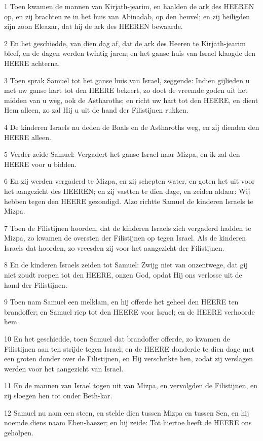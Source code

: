 \par 1 Toen kwamen de mannen van Kirjath-jearim, en haalden de ark des HEEREN op, en zij brachten ze in het huis van Abinadab, op den heuvel; en zij heiligden zijn zoon Eleazar, dat hij de ark des HEEREN bewaarde.
\par 2 En het geschiedde, van dien dag af, dat de ark des Heeren te Kirjath-jearim bleef, en de dagen werden twintig jaren; en het ganse huis van Israel klaagde den HEERE achterna.
\par 3 Toen sprak Samuel tot het ganse huis van Israel, zeggende: Indien gijlieden u met uw ganse hart tot den HEERE bekeert, zo doet de vreemde goden uit het midden van u weg, ook de Astharoths; en richt uw hart tot den HEERE, en dient Hem alleen, zo zal Hij u uit de hand der Filistijnen rukken.
\par 4 De kinderen Israels nu deden de Baals en de Astharoths weg, en zij dienden den HEERE alleen.
\par 5 Verder zeide Samuel: Vergadert het ganse Israel naar Mizpa, en ik zal den HEERE voor u bidden.
\par 6 En zij werden vergaderd te Mizpa, en zij schepten water, en goten het uit voor het aangezicht des HEEREN; en zij vastten te dien dage, en zeiden aldaar: Wij hebben tegen den HEERE gezondigd. Alzo richtte Samuel de kinderen Israels te Mizpa.
\par 7 Toen de Filistijnen hoorden, dat de kinderen Israels zich vergaderd hadden te Mizpa, zo kwamen de oversten der Filistijnen op tegen Israel. Als de kinderen Israels dat hoorden, zo vreesden zij voor het aangezicht der Filistijnen.
\par 8 En de kinderen Israels zeiden tot Samuel: Zwijg niet van onzentwege, dat gij niet zoudt roepen tot den HEERE, onzen God, opdat Hij ons verlosse uit de hand der Filistijnen.
\par 9 Toen nam Samuel een melklam, en hij offerde het geheel den HEERE ten brandoffer; en Samuel riep tot den HEERE voor Israel; en de HEERE verhoorde hem.
\par 10 En het geschiedde, toen Samuel dat brandoffer offerde, zo kwamen de Filistijnen aan ten strijde tegen Israel; en de HEERE donderde te dien dage met een groten donder over de Filistijnen, en Hij verschrikte hen, zodat zij verslagen werden voor het aangezicht van Israel.
\par 11 En de mannen van Israel togen uit van Mizpa, en vervolgden de Filistijnen, en zij sloegen hen tot onder Beth-kar.
\par 12 Samuel nu nam een steen, en stelde dien tussen Mizpa en tussen Sen, en hij noemde diens naam Eben-haezer; en hij zeide: Tot hiertoe heeft de HEERE ons geholpen.
